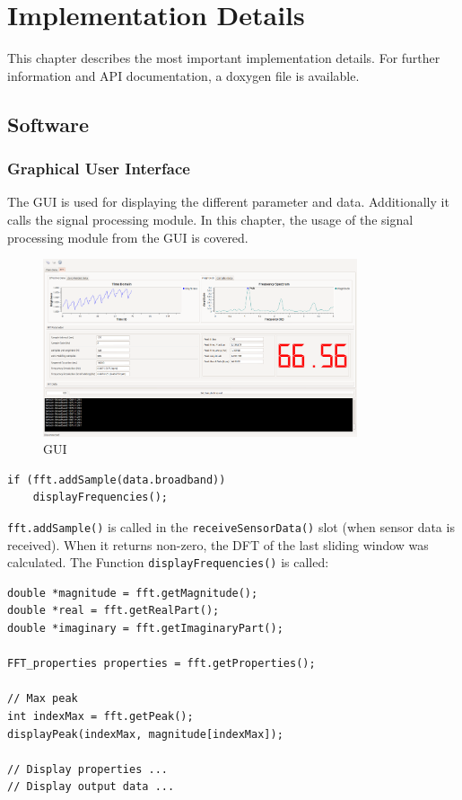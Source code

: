 \documentclass[notitlepage]{scrreprt}
\begin{document}
\chapter{Implementation Details}
\label{chap:impl-details}
This chapter describes the most important implementation details. For further information and API documentation, a doxygen file is available.

\section{Software}
\subsection{Graphical User Interface}
The GUI is used for displaying the different parameter and data. Additionally it calls the signal processing module. In this chapter, the usage of the signal processing module from the GUI is covered.

\begin{figure}[H]
	\centering
	\includegraphics[width=350px]{images/screen2.png}
	\caption{GUI}
	\label{fig:gui}
\end{figure}

\begin{lstlisting}[caption=MainWindow.cpp]
if (fft.addSample(data.broadband))
	displayFrequencies();
\end{lstlisting}

\lstinline{fft.addSample()} is called in the \lstinline{receiveSensorData()} slot (when sensor data is received). When it returns non-zero, the DFT of the last sliding window was calculated. The Function \lstinline{displayFrequencies()} is called:

\begin{lstlisting}[caption=MainWindow.cpp]
double *magnitude = fft.getMagnitude();
double *real = fft.getRealPart();
double *imaginary = fft.getImaginaryPart();

FFT_properties properties = fft.getProperties();

// Max peak
int indexMax = fft.getPeak();
displayPeak(indexMax, magnitude[indexMax]);

// Display properties ...
// Display output data ...
\end{lstlisting}
\end{document}
